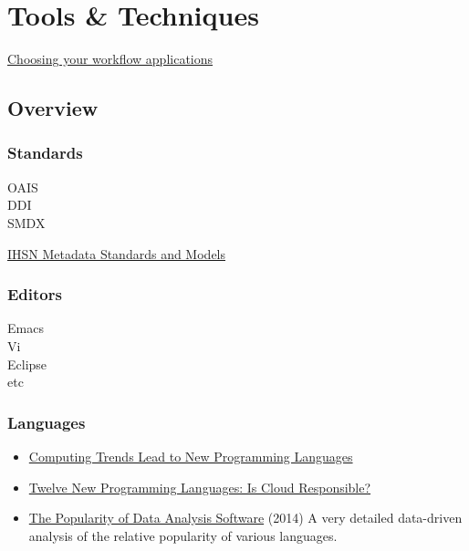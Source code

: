 \part{Tools \& Techniques}

\href{http://kieranhealy.org/files/misc/workflow-apps.pdf}{Choosing your workflow applications}

\chapter{Overview}

\section{Standards}
\label{sect:standards}

\begin{description}
\item [OAIS]
\item [DDI]
\item [SMDX]
\end{description}

\href{http://www.ihsn.org/HOME/node/135}{IHSN Metadata Standards and Models}

\section{Editors}
\label{sect:editors}

\begin{description}
\item [Emacs]
\item [Vi]
\item [Eclipse]
\item [etc]
\end{description}

\section{Languages}
\label{sect:langs}

\begin{itemize}
\item \href{http://ieeexplore.ieee.org/xpl/articleDetails.jsp?arnumber=6228573}{Computing Trends Lead to New Programming Languages}
\item \href{http://cloudcomputing.sys-con.com/node/2265359}{Twelve New Programming Languages: Is Cloud Responsible?}
\item \href{http://r4stats.com/articles/popularity/}{The Popularity of Data Analysis Software} (2014) A very detailed data-driven analysis of the relative popularity of various languages.
\end{itemize}

